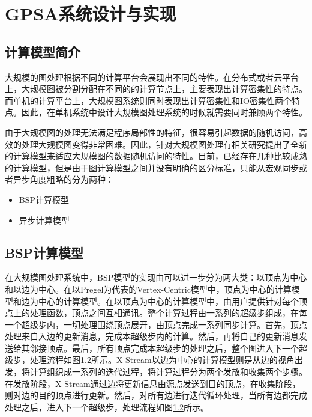 
\chapter{GPSA系统设计与实现}

\section{计算模型简介}
大规模的图处理根据不同的计算平台会展现出不同的特性。在分布式或者云平台上，大规模图被分割分配在不同的的计算节点上，主要表现出计算密集性的特点。而单机的计算平台上，大规模图系统则同时表现出计算密集性和IO密集性两个特点。因此，在单机系统中设计大规模图处理系统的时候就需要同时兼顾两个特性。

由于大规模图的处理无法满足程序局部性的特征，很容易引起数据的随机访问，高效的处理大规模图变得非常困难。因此，针对大规模图处理有相关研究提出了全新的计算模型来适应大规模图的数据随机访问的特性。目前，已经存在几种比较成熟的计算模型，但是由于图计算模型之间并没有明确的区分标准，只能从宏观同步或者异步角度粗略的分为两种：

\begin{itemize}
\item BSP计算模型
\item 异步计算模型
\end{itemize}

\section{BSP计算模型}


在大规模图处理系统中，BSP模型的实现由可以进一步分为两大类：以顶点为中心和以边为中心。在以Pregel为代表的Vertex-Centric模型中，顶点为中心的计算模型和边为中心的计算模型。在以顶点为中心的计算模型中，由用户提供针对每个顶点上的处理函数，顶点之间互相通讯。整个计算过程由一系列的超级步组成，在每一个超级步内，一切处理围绕顶点展开，由顶点完成一系列同步计算。首先，顶点处理来自入边的更新消息，完成本超级步内的计算。然后，再将自己的更新消息发送给其邻接顶点。最后，所有顶点完成本超级步的处理之后，整个图进入下一个超级步，处理流程如图\ref{}所示。X-Stream以边为中心的计算模型则是从边的视角出发，将计算组织成一系列的迭代过程，将计算过程分为两个发散和收集两个步骤。在发散阶段，X-Stream通过边将更新信息由源点发送到目的顶点，在收集阶段，则对边的目的顶点进行更新。然后，对所有边进行迭代循环处理，当所有边都完成处理之后，进入下一个超级步，处理流程如图\ref{}所示。

